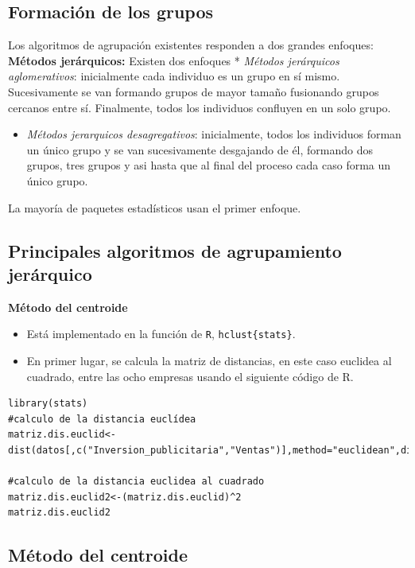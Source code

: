 \documentclass[]{article}
\providecommand{\tightlist}{%
  \setlength{\itemsep}{0pt}\setlength{\parskip}{0pt}}
\begin{document}
\subsection{Formación de los grupos}\label{formaciuxf3n-de-los-grupos}

 Los algoritmos de agrupación existentes responden a dos grandes
enfoques: \textbf{Métodos jerárquicos:} Existen dos enfoques *
\emph{Métodos jerárquicos aglomerativos}: inicialmente cada individuo es
un grupo en sí mismo. Sucesivamente se van formando grupos de mayor
tamaño fusionando grupos cercanos entre sí. Finalmente, todos los
individuos confluyen en un solo grupo.

\begin{itemize}
\tightlist
\item
  \emph{Métodos jerarquicos desagregativos}: inicialmente, todos los
  individuos forman un único grupo y se van sucesivamente desgajando de
  él, formando dos grupos, tres grupos y asi hasta que al final del
  proceso cada caso forma un único grupo.
\end{itemize}

La mayoría de paquetes estadísticos usan el primer enfoque.

\subsection{Principales algoritmos de agrupamiento
jerárquico}\label{principales-algoritmos-de-agrupamiento-jeruxe1rquico}

 \textbf{Método del centroide}

\begin{itemize}
\tightlist
\item
  Está implementado en la función de \texttt{R},
  \texttt{hclust\{stats\}}.
\item
  En primer lugar, se calcula la matriz de distancias, en este caso
  euclidea al cuadrado, entre las ocho empresas usando el siguiente
  código de R. 
\end{itemize}

\begin{verbatim}
library(stats)
#calculo de la distancia euclídea
matriz.dis.euclid<-dist(datos[,c("Inversion_publicitaria","Ventas")],method="euclidean",diag=TRUE)

#calculo de la distancia euclidea al cuadrado
matriz.dis.euclid2<-(matriz.dis.euclid)^2
matriz.dis.euclid2
\end{verbatim}

\subsection{Método del centroide}\label{muxe9todo-del-centroide}
\end{document}
